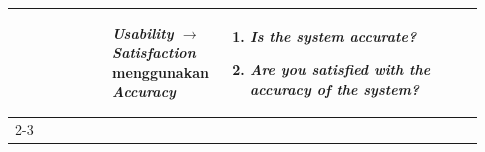 \begin{longtable}{|p{0.2\linewidth}|p{0.2\linewidth}|p{0.53\linewidth}|}
                                                                  & \textbf{\textit{Usability} $\rightarrow$ \textit{Satisfaction}} menggunakan \textbf{\textit{Accuracy}}                                                  & \begin{enumerate}[before=\vspace{-8pt}, leftmargin=*, nosep, series=SA] \item \textit{Is the system accurate?} \item \textit{Are you satisfied with the accuracy of the system?} \end{enumerate}                                                                                                                                                                                                                                                                                                                                                                                                                                                                                                                                                                                                                                                                                                                                                                                                                                                                                                                                                                                                                                                                                                                                                                                                                             \\
      \cline{2-3}


\end{longtable}
